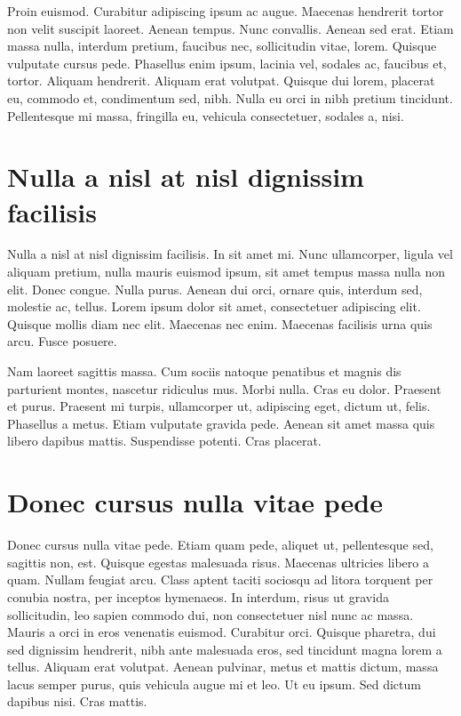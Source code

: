 \documentclass[eng,printmode]{mgr}
\begin{document}
Proin euismod. Curabitur adipiscing ipsum ac augue. Maecenas hendrerit tortor non velit suscipit laoreet. Aenean tempus. Nunc convallis. Aenean sed erat. Etiam massa nulla, interdum pretium, faucibus nec, sollicitudin vitae, lorem. Quisque vulputate cursus pede. Phasellus enim ipsum, lacinia vel, sodales ac, faucibus et, tortor. Aliquam hendrerit. Aliquam erat volutpat. Quisque dui lorem, placerat eu, commodo et, condimentum sed, nibh. Nulla eu orci in nibh pretium tincidunt. Pellentesque mi massa, fringilla eu, vehicula consectetuer, sodales a, nisi. 


\chapter{Nulla a nisl at nisl dignissim facilisis}
Nulla a nisl at nisl dignissim facilisis. In sit amet mi. Nunc ullamcorper, ligula vel aliquam pretium, nulla mauris euismod ipsum, sit amet tempus massa nulla non elit. Donec congue. Nulla purus. Aenean dui orci, ornare quis, interdum sed, molestie ac, tellus. Lorem ipsum dolor sit amet, consectetuer adipiscing elit. Quisque mollis diam nec elit. Maecenas nec enim. Maecenas facilisis urna quis arcu. Fusce posuere. 

Nam laoreet sagittis massa. Cum sociis natoque penatibus et magnis dis parturient montes, nascetur ridiculus mus. Morbi nulla. Cras eu dolor. Praesent et purus. Praesent mi turpis, ullamcorper ut, adipiscing eget, dictum ut, felis. Phasellus a metus. Etiam vulputate gravida pede. Aenean sit amet massa quis libero dapibus mattis. Suspendisse potenti. Cras placerat. 

\appendix
\chapter{Donec cursus nulla vitae pede}
Donec cursus nulla vitae pede. Etiam quam pede, aliquet ut, pellentesque sed, sagittis non, est. Quisque egestas malesuada risus. Maecenas ultricies libero a quam. Nullam feugiat arcu. Class aptent taciti sociosqu ad litora torquent per conubia nostra, per inceptos hymenaeos. In interdum, risus ut gravida sollicitudin, leo sapien commodo dui, non consectetuer nisl nunc ac massa. Mauris a orci in eros venenatis euismod. Curabitur orci. Quisque pharetra, dui sed dignissim hendrerit, nibh ante malesuada eros, sed tincidunt magna lorem a tellus. Aliquam erat volutpat. Aenean pulvinar, metus et mattis dictum, massa lacus semper purus, quis vehicula augue mi et leo. Ut eu ipsum. Sed dictum dapibus nisi. Cras mattis.
\end{document}
